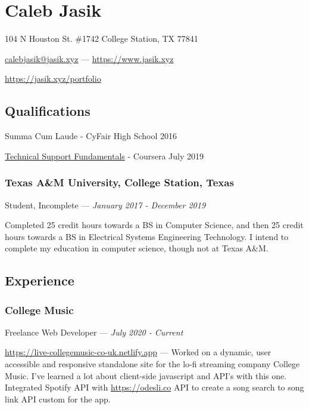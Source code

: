 \documentclass[letterpaper,10pt]{article}
\begin{document}
    \section{\Huge Caleb Jasik}\label{sec:hugecaleb-jasik}

    \hfill 104 N Houston St. \#1742 College Station, TX 77841

    \hfill \href{mailto:calebjasik@jasik.xyz}{calebjasik@jasik.xyz} ---
    \href{https://jasik.xyz}{https://www.jasik.xyz}
    
    \hfill \href{https://jasik.xyz/portfolio}{https://jasik.xyz/portfolio}

    \subsection{Qualifications}\label{subsec:qualifications}

    Summa Cum Laude - CyFair High School 2016

    \href{https://www.coursera.org/account/accomplishments/verify/GZEYJ5VA2YGH}{Technical Support Fundamentals} - Coursera July 2019

    \subsubsection{Texas A\&M University, College Station, Texas}
    \hfill Student, Incomplete --- \emph{January 2017 - December 2019}

    Completed 25 credit hours towards a BS in Computer Science, and then 25 credit hours towards a BS in Electrical Systems Engineering Technology. I intend to complete my education in computer science, though not at Texas A\&M.

    \subsection{Experience}\label{subsec:experience}

    \subsubsection{College Music}
    \hfill Freelance Web Developer --- \emph{July 2020 - Current}

    \href{https://live-collegemusic-co-uk.netlify.app}{https://live-collegemusic-co-uk.netlify.app} --- Worked on a dynamic, user accessible and responsive standalone site for the lo-fi streaming company College Music. I've learned a lot about client-side javascript and API's with this one. Integrated Spotify API with \href{https://odesli.co}{https://odesli.co} API to create a song search to song link API custom for the app.
\end{document}
